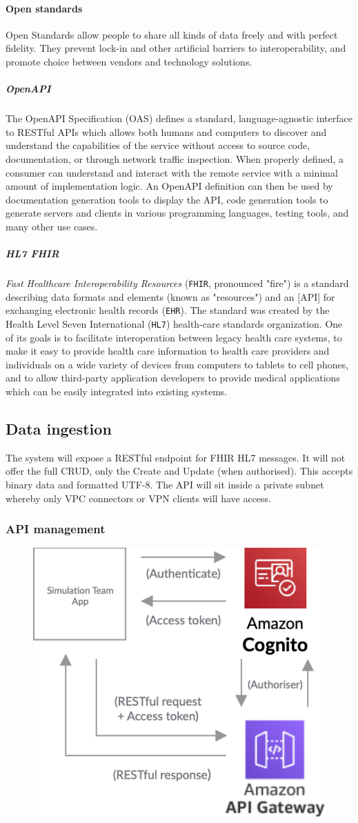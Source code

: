 \documentclass[10pt]{article}
\begin{document}
\paragraph{Open standards}
Open Standards allow people to share all kinds of data freely and with perfect fidelity. They prevent lock-in and other artificial barriers to interoperability, and promote choice between vendors and technology solutions. \cite{openstandards}

\subparagraph{OpenAPI}
The OpenAPI Specification (OAS) defines a standard, language-agnostic interface to RESTful APIs which allows both humans and computers to discover and understand the capabilities of the service without access to source code, documentation, or through network traffic inspection. When properly defined, a consumer can understand and interact with the remote service with a minimal amount of implementation logic. An OpenAPI definition can then be used by documentation generation tools to display the API, code generation tools to generate servers and clients in various programming languages, testing tools, and many other use cases. \cite{openapi}

\subparagraph{HL7 FHIR}
\textit{Fast Healthcare Interoperability Resources} (\texttt{FHIR}, pronounced "fire") is a standard describing data formats and elements (known as "resources") and an [API] for exchanging electronic health records (\texttt{EHR}). The standard was created by the Health Level Seven International (\texttt{HL7}) health-care standards organization. One of its goals is to facilitate interoperation between legacy health care systems, to make it easy to provide health care information to health care providers and individuals on a wide variety of devices from computers to tablets to cell phones, and to allow third-party application developers to provide medical applications which can be easily integrated into existing systems. \cite{fhir}

\subsection{Data ingestion}
The system will expose a RESTful endpoint for FHIR HL7 messages. It will not offer the full CRUD, only the Create and Update (when authorised). This accepts binary data and formatted UTF-8. The API will sit inside a private subnet whereby only VPC connectors or VPN clients will have access.
\subsubsection{API management}
\begin{figure}[h!]
	\centering
	\includegraphics[width=0.4\linewidth]{images/APIGateway.png}
\end{figure}
\end{document}
